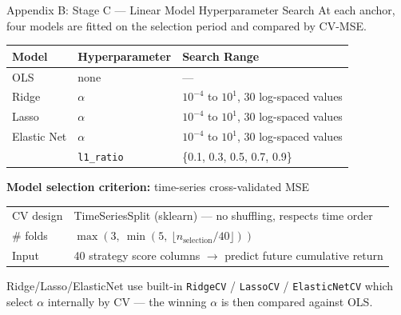 \documentclass[aspectratio=169]{beamer}
\begin{document}
\begin{frame}{Appendix B: Stage C — Linear Model Hyperparameter Search}
  \small
  At each anchor, four models are fitted on the selection period and compared by CV-MSE.

  \vspace{0.4em}
  \begin{tabular}{lll}
    \toprule
    Model & Hyperparameter & Search Range \\
    \midrule
    OLS          & none & — \\
    Ridge        & $\alpha$ & $10^{-4}$ to $10^{1}$, 30 log-spaced values \\
    Lasso        & $\alpha$ & $10^{-4}$ to $10^{1}$, 30 log-spaced values \\
    Elastic Net  & $\alpha$ & $10^{-4}$ to $10^{1}$, 30 log-spaced values \\
                 & \texttt{l1\_ratio} & \{0.1, 0.3, 0.5, 0.7, 0.9\} \\
    \bottomrule
  \end{tabular}

  \vspace{0.5em}
  \textbf{Model selection criterion:} time-series cross-validated MSE

  \vspace{0.3em}
  \begin{tabular}{ll}
    \toprule
    CV design & TimeSeriesSplit (sklearn) — no shuffling, respects time order \\
    \# folds  & $\max(3,\ \min(5,\ \lfloor n_{\text{selection}} / 40 \rfloor))$ \\
    Input     & 40 strategy score columns $\to$ predict future cumulative return \\
    \bottomrule
  \end{tabular}

  \vspace{0.4em}
  \footnotesize
  Ridge/Lasso/ElasticNet use built-in \texttt{RidgeCV} / \texttt{LassoCV} / \texttt{ElasticNetCV}
  which select $\alpha$ internally by CV — the winning $\alpha$ is then compared against OLS.
\end{frame}
\end{document}
